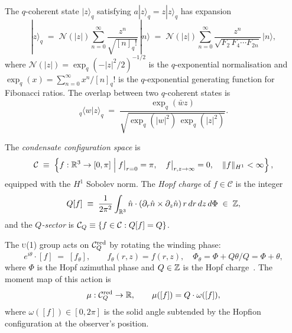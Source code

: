 \begin{corollary}
\label{P10:cor:coherent}
The $q$-coherent state $|z\rangle_q$ satisfying $a|z\rangle_q = z|z\rangle_q$ has
expansion
\begin{equation}
  |z\rangle_q
  \;=\; \mathcal{N}(|z|)\sum_{n=0}^\infty
  \frac{z^n}{\sqrt{[n]_q!}}\,|n\rangle
  \;=\; \mathcal{N}(|z|)\sum_{n=0}^\infty
  \frac{z^n}{\sqrt{F_2\,F_4\cdots F_{2n}}}\,|n\rangle,
  \label{P10:eq:q_coherent}
\end{equation}
where $\mathcal{N}(|z|) = \exp_q(-|z|^2/2)^{-1/2}$ is the
$q$-exponential normalisation and
$\exp_q(x) = \sum_{n=0}^\infty x^n/[n]_q!$
is the $q$-exponential generating function for Fibonacci ratios.
The overlap between two $q$-coherent states is
\begin{equation}
  {}_q\langle w|z\rangle_q
  \;=\; \frac{\exp_q(\bar{w}z)}{\sqrt{\exp_q(|w|^2)\,\exp_q(|z|^2)}}.
  \label{P10:eq:coherent_overlap}
\end{equation}
\end{corollary}

\begin{definition}
\label{P10:def:config}
The \emph{condensate configuration space} is
\begin{equation}
  \mathcal{C}
  \;\equiv\; \left\{f:\mathbb{R}^3\to[0,\pi]
  \;\Big|\;
  f\big|_{r=0}=\pi,\quad
  f\big|_{r,z\to\infty}=0,\quad
  \|f\|_{H^1}<\infty
  \right\},
  \label{P10:eq:config}
\end{equation}
equipped with the $H^1$ Sobolev norm.
The \emph{Hopf charge} of $f\in\mathcal{C}$ is the integer
\begin{equation}
  Q[f] \;\equiv\; \frac{1}{2\pi^2}\int_{\mathbb{R}^3}
  \hat{n}\cdot(\partial_r\hat{n}\times\partial_z\hat{n})\,
  r\,dr\,dz\,d\Phi
  \;\in\; \mathbb{Z},
  \label{P10:eq:hopf_charge}
\end{equation}
and the \emph{$Q$-sector} is $\mathcal{C}_Q \equiv \{f\in\mathcal{C} : Q[f]=Q\}$.
\end{definition}

\begin{definition}
\label{P10:def:U1}
The \textsc{u}(1) group acts on $\mathcal{C}_Q^{\mathrm{red}}$ by rotating the
winding phase:
\begin{equation}
  e^{i\theta}\cdot [f]
  \;=\; [f_\theta],
  \qquad
  f_\theta(r,z) = f(r,z),\quad
  \Phi_\theta = \Phi + Q\theta/Q = \Phi + \theta,
  \label{P10:eq:U1_action}
\end{equation}
where $\Phi$ is the Hopf azimuthal phase and $Q\in\mathbb{Z}$ is the
Hopf charge~\cite{Paper1,Paper9}.
The moment map of this action is
\begin{equation}
  \mu: \mathcal{C}_Q^{\mathrm{red}} \to \mathbb{R},
  \qquad
  \mu([f]) = Q\cdot\omega([f]),
  \label{P10:eq:moment}
\end{equation}
where $\omega([f])\in[0,2\pi]$ is the solid angle subtended by
the Hopfion configuration at the observer's position.
\end{definition}

